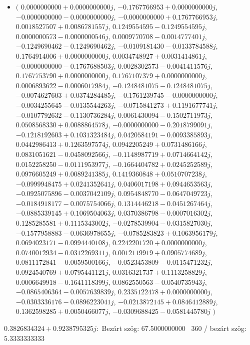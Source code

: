 \documentclass[14pt,a4paper]{article}
\begin{document}
\begin{itemize}
\item
$\big($
$0.0000000000+0.0000000000j$, $-0.1767766953+0.0000000000j$, $-0.0000000000-0.0000000000j$, $-0.0000000000+0.1767766953j$, $0.0018527507+0.0086781557j$, $0.1249554595-0.1249554595j$, $0.0000000573-0.0000000546j$, $0.0009770708-0.0014777401j$, $-0.1249690462-0.1249690462j$, $-0.0109181430-0.0133784588j$, $0.1764914006+0.0000000000j$, $0.0034748927+0.0031414861j$, $-0.0000000000-0.1767688503j$, $0.0028302573-0.0041411576j$, $0.1767753790+0.0000000000j$, $0.1767107379+0.0000000000j$, $0.0006893622-0.0006017984j$, $-0.1248481075-0.1248481075j$, $-0.0074627603+0.0374284485j$, $-0.1761239745-0.0000000000j$, $-0.0034255645-0.0135544263j$, $-0.0715841273+0.1191677741j$, $-0.0107792632-0.1130736284j$, $0.0061430094-0.1502711973j$, $0.0508568330+0.0088864578j$, $-0.0000000000-0.2018799091j$, $-0.1218192603+0.1031323484j$, $0.0420584191-0.0093385893j$, $0.0442986413+0.1263597574j$, $0.0942205249+0.0731486166j$, $0.0831051621-0.0458092566j$, $-0.1148987719+0.0714664142j$, $0.0152258250-0.0111953977j$, $-0.1664404782+0.0245252589j$, $0.0976605249+0.0089241385j$, $0.1419360848+0.0510707238j$, $-0.0999948475+0.0241352641j$, $0.0406017198+0.0944653563j$, $-0.0925075896-0.0037042109j$, $0.0954848770-0.0647049723j$, $-0.0184918177-0.0075754066j$, $0.1314446218-0.0451267464j$, $-0.0885339145+0.1069504063j$, $0.0370386798-0.0007016302j$, $0.1285285581+0.1115343002j$, $-0.0278539904-0.0315827030j$, $-0.1577958883-0.0636978655j$, $-0.0785283823+0.1063956179j$, $0.0694023171-0.0994440108j$, $0.2242201720+0.0000000000j$, $0.0740012934-0.0312269311j$, $0.0012119919+0.0905774689j$, $0.0811172841-0.0059500166j$, $-0.0523453809-0.0115471232j$, $0.0924540769+0.0795441121j$, $0.0316321737+0.1113258829j$, $0.0006649918-0.1641118399j$, $0.0862550563-0.0540735943j$, $-0.0865406364-0.0057639839j$, $0.2335122478+0.0000000000j$, $-0.0303336176-0.0896223041j$, $-0.0213872145+0.0846412889j$, $0.1362598285+0.0050466077j$, $-0.0309688425-0.0581445780j$
$\big)$
\end{itemize}
$0.3826834324+0.9238795325j$:\
Bezárt szög: $67.5000000000$ \
360 / bezárt szög: $5.3333333333$\
\end{document}
